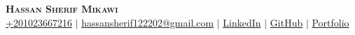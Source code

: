 \documentclass[letterpaper,10.5pt]{article}
\makeatletter
\newcommand{\resumeEducationHeading}[6]{
  \vspace{-2pt}\item
    \begin{tabular*}{0.97\textwidth}[t]{l@{\extracolsep{\fill}}r}
      \textbf{#1} & #2 \\
      \textit{\small#3} & \textit{\small #4} \\
      \textit{\small#5} & \textit{\small #6} \\
    \end{tabular*}\vspace{-5pt}
}
\newcommand{\resumeSubHeadingListStart}{\begin{itemize}[leftmargin=0.15in, label={}]}
\newcommand{\resumeSubHeadingListEnd}{\end{itemize}}
\makeatother
\begin{document}

\begin{center}
    \textbf{\Huge \scshape Hassan Sherif Mikawi} \\ \vspace{5pt}
    \small
    \hspace{.5pt} \href{tel:+201023667216}{+201023667216}
    $|$
    \hspace{.5pt} \href{mailto:hassansherif122202@gmail.com}{hassansherif122202@gmail.com}
    $|$
    \hspace{.5pt} \href{https://www.linkedin.com/in/mikawi}{LinkedIn}
    $|$
    \hspace{.5pt} \href{https://github.com/Hassan220022}{GitHub}
    $|$
    \faGlobe \hspace{.5pt} \href{https://mikawi.org}{Portfolio}
\end{center}









  
\end{document}
